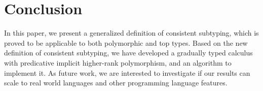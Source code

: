 
\section{Conclusion}
\label{sec:conclusion}

In this paper, we present a generalized definition of consistent subtyping,
which is proved to be applicable to both polymorphic and top types. Based on the new
definition of consistent subtyping, we have developed a gradually typed calculus
with predicative implicit higher-rank polymorphism, and an algorithm to
implement it.
As future work, we are interested to investigate if our results can scale to
real world languages and other programming language features.


